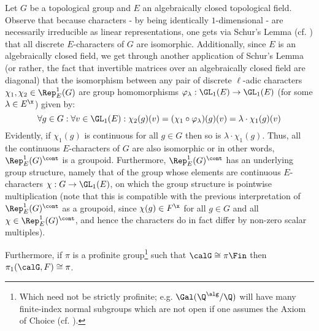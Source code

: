 \begin{remark} \label{remark: groupoids_of_characters}
            Let $G$ be a topological group and $E$ an algebraically closed topological field. Observe that because characters - by being identically $1$-dimensional - are necessarily irreducible as linear representations, one gets via Schur's Lemma (cf. \cite[Lemma 3.6, pp. 35]{lam_first_course_in_noncommutative_rings}) that all discrete $E$-characters of $G$ are isomorphic. Additionally, since $E$ is an algebraically closed field, we get through another application of Schur's Lemma (or rather, the fact that invertible matrices over an algebraically closed field are diagonal) that the isomorphism between any pair of discrete $\ell$-adic characters $\chi_1, \chi_2 \in \Rep^1_E(G)$ are group homomorphisms $\varphi_{\lambda}: \GL_1(E) \to \GL_1(E)$ (for some $\lambda \in E^{\x}$) given by:
                $$\forall g \in G: \forall v \in \GL_1(E): \chi_2(g)(v) = (\chi_1 \circ \varphi_{\lambda})(g)(v) = \lambda \cdot \chi_1(g)(v)$$
            Evidently, if $\chi_1(g)$ is continuous for all $g \in G$ then so is $\lambda \cdot \chi_1(g)$. Thus, all the continuous $E$-characters of $G$ are also isomorphic or in other words, $\Rep^1_E(G)^{\cont}$ is a groupoid. Furthermore, $\Rep^1_E(G)^{\cont}$ has an underlying group structure, namely that of the group whose elements are continuous $E$-characters $\chi: G \to \GL_1(E)$, on which the group structure is pointwise multiplication (note that this is compatible with the previous interpretation of $\Rep^1_E(G)^{\cont}$ as a groupoid, since $\chi(g) \in F^{\x}$ for all $g \in G$ and all $\chi \in \Rep^1_E(G)^{\cont}$, and hence the characters do in fact differ by non-zero scalar multiples).
        \end{remark}
        
Furthermore, if $\pi$ is a profinite group\footnote{Which need not be strictly profinite; e.g. $\Gal(\Q^{\alg}/\Q)$ will have many finite-index normal subgroups which are not open if one assumes the Axiom of Choice (cf. \cite[Proposition 7.26]{milne_field_theory}).} such that $\calG \cong \pi\-\Fin$ then $\pi_1(\calG, F) \cong \pi$.

